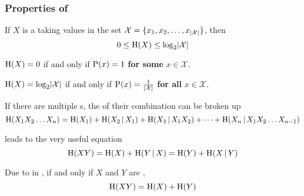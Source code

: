 \subsubsection{Properties of }\label{subsubsec:Entropy_Properties}
\begin{propertylist}
\item If $X$ is a  taking values in the set $\mathcal{X} = \lbrace x_{1}, x_{2}, \ldots, x_{\lvert \mathcal{X} \rvert} \rbrace$, then\label{prop:Entropy_Bounds}
  \begin{equation}\label{eq:Entropy_Bounds}
    0 \leq \operatorname{\operatorname{H}}(X) \leq \log_{2} \lvert \mathcal{X} \rvert
  \end{equation}
\item $\operatorname{\operatorname{H}}(X) = 0$ if and only if $\operatorname{\operatorname{P}}(x) = 1$ \textbf{for some} $x \in \mathcal{X}$.\label{prop:Entropy_Min_Bound}
\item $\operatorname{\operatorname{H}}(X) = \log_{2} \lvert \mathcal{X} \rvert$ if and only if $\operatorname{\operatorname{P}}(x) = \frac{1}{\lvert \mathcal{X} \rvert}$ \textbf{for all} $x \in \mathcal{X}$.\label{prop:Entropy_Max_Bound}
\item If there are multiple s, the  of their combination can be broken up\label{prop:Entropy_Splitting}
  \begin{equation}\label{eq:Entropy_Splitting}
    \operatorname{\operatorname{H}}(X_{1}X_{2}\ldots X_{n}) = \operatorname{\operatorname{H}}(X_{1}) + \operatorname{\operatorname{H}}(X_{2} \operatorname{\vert} X_{1}) + \operatorname{\operatorname{H}}(X_{3} \operatorname{\vert} X_{1}X_{2}) + \cdots + \operatorname{\operatorname{H}}(X_{n} \operatorname{\vert} X_{1}X_{2} \ldots X_{n-1})
  \end{equation}
\item {} leads to the very useful equation\label{prop:Entropy_Multiple_Variable_Equivalence}
  \begin{equation}\label{eq:Entropy_Multiple_Variable_Equivalence}
    \operatorname{\operatorname{H}}(XY) = \operatorname{\operatorname{H}}(X) + \operatorname{\operatorname{H}}(Y \operatorname{\vert} X) = \operatorname{\operatorname{H}}(Y) + \operatorname{\operatorname{H}}(X \operatorname{\vert} Y)
  \end{equation}
\item Due to  in , if and only if $X$ and $Y$ are ,\label{prop:Entropy_Independent_Random_Variable}
  \begin{equation}\label{eq:Entropy_Independent_Random_Variable}
    \operatorname{\operatorname{H}}(XY) = \operatorname{\operatorname{H}}(X) + \operatorname{\operatorname{H}}(Y)
  \end{equation}
\end{propertylist}


